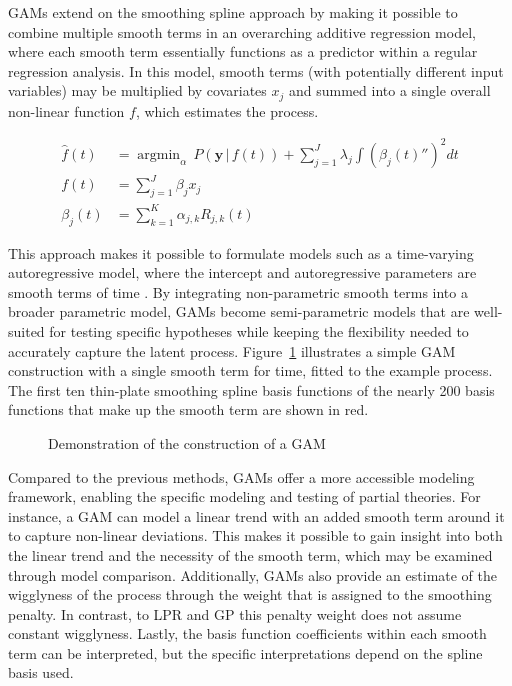 \documentclass[man, floatsintext]{apa7}
\DeclareMathOperator*{\argmin}{argmin}
\begin{document}
GAMs extend on the smoothing spline approach by making it possible to combine
multiple smooth terms in an overarching additive regression model, where each
smooth term essentially functions as a predictor within a regular regression
analysis. In this model, smooth terms (with potentially different input
variables) may be multiplied by covariates $x_j$ and
summed into a single overall non-linear function $f$, which estimates the
process.

\begin{equation}
  \begin{aligned}
    \hat{f}(t) & = \argmin_\alpha \, P(\textbf{y} \, | \, f(t)) +
    \sum_{j = 1}^{J} \lambda_j \int {(\beta_j(t)'')}^2 dt         \\
    f(t)       & = \sum_{j = 1}^{J} \beta_j x_j                   \\
    \beta_j(t) & = \sum^K_{k = 1} \alpha_{j,k} R_{j, k}(t)
  \end{aligned}
\end{equation}

\noindent This approach makes it possible to formulate models such
as a time-varying autoregressive model, where the intercept and autoregressive
parameters are smooth terms of time \parencite{bringmann_changing_2017,
  bringmann_modeling_2015}. By integrating non-parametric smooth terms into a
broader parametric model, GAMs become semi-parametric models that are
well-suited for testing specific hypotheses while keeping the flexibility
needed to accurately capture the latent process. Figure~\ref{fig:gam_dem}
illustrates a simple GAM construction with a single smooth term for time,
fitted to the example process. The first ten thin-plate smoothing spline basis
functions of the nearly 200 basis functions that make up the smooth term are
shown in red.

\begin{figure}[!t]
  \caption{Demonstration of the construction of a GAM}
  \label{fig:gam_dem}
\end{figure}

Compared to the previous methods, GAMs offer a more accessible modeling
framework, enabling the specific modeling and testing of partial theories. For
instance, a GAM can model a linear trend with an added smooth term around it to
capture non-linear deviations. This makes it possible to gain insight into both
the linear trend and the necessity of the smooth term, which may be examined
through model comparison. Additionally, GAMs also provide an estimate of the
wigglyness of the process through the weight that is assigned to the smoothing
penalty. In contrast, to LPR and GP this penalty weight does not assume
constant wigglyness. Lastly, the basis function coefficients within each smooth
term can be interpreted, but the specific interpretations depend on the spline
basis used.
\end{document}
